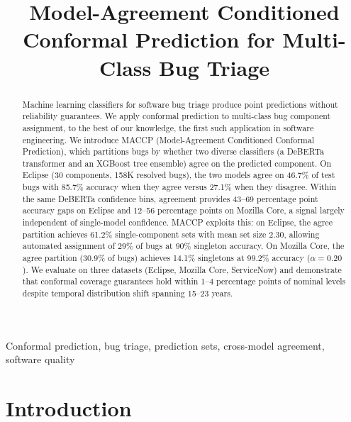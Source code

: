 \documentclass[conference]{IEEEtran}
\begin{document}
\title{Model-Agreement Conditioned Conformal Prediction for Multi-Class Bug Triage}

\author{
}

\maketitle

\begin{abstract}
Machine learning classifiers for software bug triage produce point predictions without reliability guarantees. We apply conformal prediction to multi-class bug component assignment, to the best of our knowledge, the first such application in software engineering. We introduce MACCP (Model-Agreement Conditioned Conformal Prediction), which partitions bugs by whether two diverse classifiers (a DeBERTa transformer and an XGBoost tree ensemble) agree on the predicted component. On Eclipse (30 components, 158K resolved bugs), the two models agree on 46.7\% of test bugs with 85.7\% accuracy when they agree versus 27.1\% when they disagree. Within the same DeBERTa confidence bins, agreement provides 43--69 percentage point accuracy gaps on Eclipse and 12--56 percentage points on Mozilla Core, a signal largely independent of single-model confidence. MACCP exploits this: on Eclipse, the agree partition achieves 61.2\% single-component sets with mean set size 2.30, allowing automated assignment of 29\% of bugs at 90\% singleton accuracy. On Mozilla Core, the agree partition (30.9\% of bugs) achieves 14.1\% singletons at 99.2\% accuracy ($\alpha{=}0.20$). We evaluate on three datasets (Eclipse, Mozilla Core, ServiceNow) and demonstrate that conformal coverage guarantees hold within 1--4 percentage points of nominal levels despite temporal distribution shift spanning 15--23 years.
\end{abstract}

\begin{IEEEkeywords}
Conformal prediction, bug triage, prediction sets, cross-model agreement, software quality
\end{IEEEkeywords}

\section{Introduction}\label{sec:intro}
\end{document}
